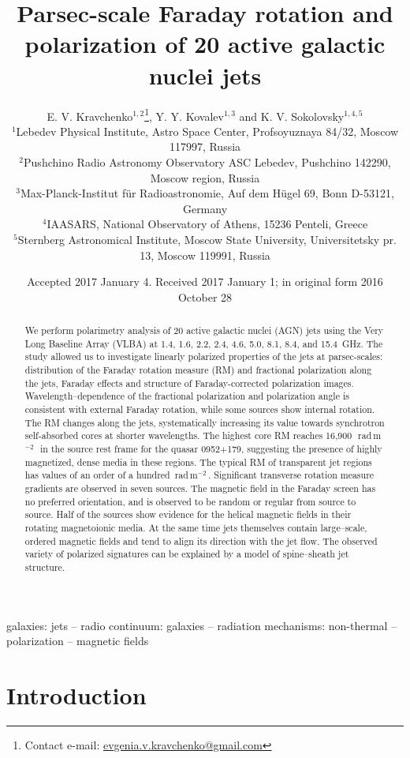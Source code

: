 \documentclass[a4paper,fleqn,usenatbib,useAMS]{mnras}
\title[Faraday RM and polarization of 20 AGN jets]{Parsec-scale Faraday rotation and polarization of 20 active galactic nuclei jets}
\author[E. V. Kravchenko, Y. Y. Kovalev and K. V. Sokolovsky]{E. V. Kravchenko$^{1,2}$\thanks{Contact e-mail: \href{mailto:evgenia.v.kravchenko@gmail.com}{evgenia.v.kravchenko@gmail.com}}, Y. Y. Kovalev$^{1,3}$ and K. V. Sokolovsky$^{1,4,5}$\\
$^{1}$Lebedev Physical Institute, Astro Space Center, Profsoyuznaya 84/32, Moscow 117997, Russia\\
$^{2}$Pushchino Radio Astronomy Observatory ASC Lebedev, Pushchino 142290, Moscow region, Russia\\
$^{3}$Max-Planck-Institut f\"ur Radioastronomie, Auf dem H\"ugel 69, Bonn D-53121, Germany\\
$^{4}$IAASARS, National Observatory of Athens, 15236 Penteli, Greece\\
$^{5}$Sternberg Astronomical Institute, Moscow State University, Universitetsky pr. 13, Moscow 119991, Russia\\}
\date{Accepted 2017 January 4. Received 2017 January 1; in original form 2016 October 28}
\newcommand{\rmu}{\,rad\,m$^{-2}$\,} %
\begin{document}
\label{firstpage}
\pagerange{\pageref{firstpage}--\pageref{lastpage}}
\maketitle

\begin{abstract}
We perform polarimetry analysis of 20 active galactic nuclei (AGN) jets using the Very Long Baseline Array (VLBA) at 1.4, 1.6, 2.2, 2.4, 4.6, 5.0, 8.1, 8.4, and 15.4~GHz. The study allowed us to investigate linearly polarized properties of the jets at parsec-scales: distribution of the Faraday rotation measure (RM) and fractional polarization along the jets, Faraday effects and structure of Faraday-corrected polarization images. Wavelength--dependence of the fractional polarization and polarization angle is consistent with external Faraday rotation, while some sources show internal rotation. The RM changes along the jets, systematically increasing its value towards synchrotron self-absorbed cores at shorter wavelengths.
The highest core RM reaches 16,900~\rmu\ in the source rest frame for the quasar 0952+179, suggesting the presence of highly magnetized, dense media in these regions. The typical RM of transparent jet regions has values of an order of a hundred \rmu.
Significant transverse rotation measure gradients are observed in seven sources.
The magnetic field in the Faraday screen has no preferred orientation, and is observed to be random or regular from source to source. Half of the sources show evidence for the helical magnetic fields in their rotating magnetoionic media.
At the same time jets themselves contain large--scale, ordered magnetic fields and tend to align its direction with the jet flow. The observed variety of polarized signatures can be explained by a model of spine--sheath jet structure.


\end{abstract}

\begin{keywords}
galaxies: jets --
radio continuum: galaxies --
radiation mechanisms: non-thermal --
polarization --
magnetic fields
\end{keywords}

\section{Introduction}
\end{document}
